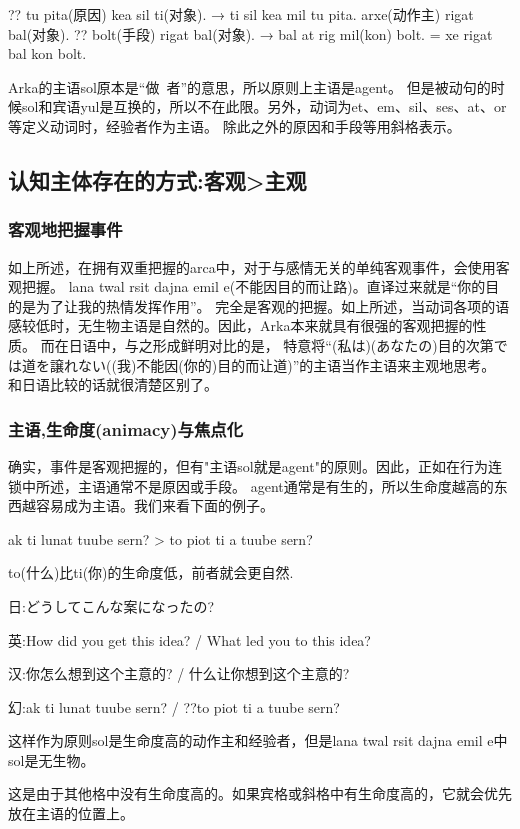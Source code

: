 ?? tu pita(原因) kea sil ti(对象). → ti sil kea mil tu pita.
arxe(动作主) rigat bal(对象).
?? bolt(手段) rigat bal(对象). → bal at rig mil(kon) bolt. = xe rigat bal kon bolt.

Arka的主语sol原本是“做~者”的意思，所以原则上主语是agent。
但是被动句的时候sol和宾语yul是互换的，所以不在此限。另外，动词为et、em、sil、ses、at、or等定义动词时，经验者作为主语。
除此之外的原因和手段等用斜格表示。

\subsection{认知主体存在的方式:客观>主观}

\subsubsection{客观地把握事件}

如上所述，在拥有双重把握的arca中，对于与感情无关的单纯客观事件，会使用客观把握。
lana twal rsit dajna emil e(不能因目的而让路)。直译过来就是“你的目的是为了让我的热情发挥作用”。
完全是客观的把握。如上所述，当动词各项的语感较低时，无生物主语是自然的。因此，Arka本来就具有很强的客观把握的性质。
而在日语中，与之形成鲜明对比的是，
特意将“(私は)(あなたの)目的次第では道を譲れない((我)不能因(你的)目的而让道)”的主语当作主语来主观地思考。
和日语比较的话就很清楚区别了。

\subsubsection{主语,生命度(animacy)与焦点化}


确实，事件是客观把握的，但有"主语sol就是agent"的原则。因此，正如在行为连锁中所述，主语通常不是原因或手段。
agent通常是有生的，所以生命度越高的东西越容易成为主语。我们来看下面的例子。

ak ti lunat tuube sern? > to piot ti a tuube sern?

to(什么)比ti(你)的生命度低，前者就会更自然.

日:どうしてこんな案になったの?

英:How did you get this idea? / What led you to this idea?

汉:你怎么想到这个主意的? / 什么让你想到这个主意的?

幻:ak ti lunat tuube sern? / ??to piot ti a tuube sern?

这样作为原则sol是生命度高的动作主和经验者，但是lana twal rsit dajna emil e中sol是无生物。

这是由于其他格中没有生命度高的。如果宾格或斜格中有生命度高的，它就会优先放在主语的位置上。

